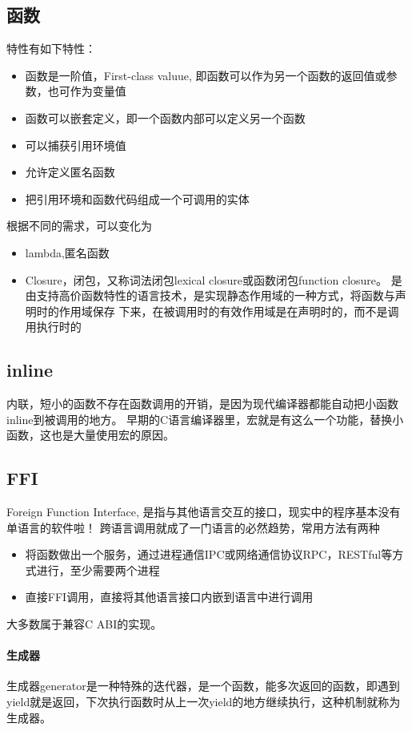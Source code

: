 \subsection{函数}
特性有如下特性：
\begin{itemize}
    \item {函数是一阶值，First-class valuue, 即函数可以作为另一个函数的返回值或参数，也可作为变量值}
    \item {函数可以嵌套定义，即一个函数内部可以定义另一个函数}
    \item {可以捕获引用环境值}
    \item {允许定义匿名函数}
    \item {把引用环境和函数代码组成一个可调用的实体}
\end{itemize}
根据不同的需求，可以变化为
\begin{itemize}
    \item {lambda,匿名函数}
    \item {Closure，闭包，又称词法闭包lexical closure或函数闭包function closure。
    是由支持高价函数特性的语言技术，是实现静态作用域的一种方式，将函数与声明时的作用域保存
    下来，在被调用时的有效作用域是在声明时的，而不是调用执行时的}
\end{itemize}

\subsection{inline}
内联，短小的函数不存在函数调用的开销，是因为现代编译器都能自动把小函数inline到被调用的地方。
早期的C语言编译器里，宏就是有这么一个功能，替换小函数，这也是大量使用宏的原因。

\subsection{FFI}
Foreign Function Interface, 是指与其他语言交互的接口，现实中的程序基本没有单语言的软件啦！
跨语言调用就成了一门语言的必然趋势，常用方法有两种
\begin{itemize}
    \item {将函数做出一个服务，通过进程通信IPC或网络通信协议RPC，RESTful等方式进行，至少需要两个进程}
    \item {直接FFI调用，直接将其他语言接口内嵌到语言中进行调用}
\end{itemize}
大多数属于兼容C ABI的实现。

\paragraph{生成器}
生成器generator是一种特殊的迭代器，是一个函数，能多次返回的函数，即遇到yield就是返回，下次执行函数时从上一次yield的地方继续执行，这种机制就称为生成器。

